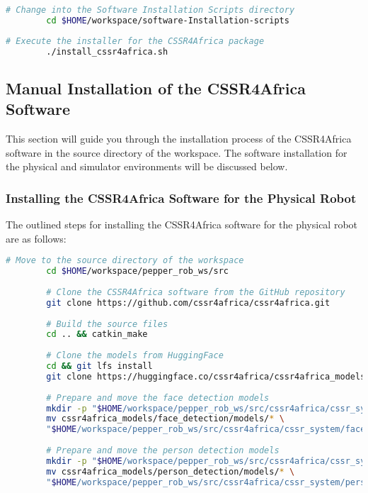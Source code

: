 \documentclass{CSSRforAfrica}
\begin{document}
{		\begin{lstlisting}[style=withoutNumbering, language=bash]
		# Change into the Software Installation Scripts directory
		cd $HOME/workspace/software-Installation-scripts
		\end{lstlisting}
		
		\begin{lstlisting}[style=withoutNumbering, language=bash]
		# Execute the installer for the CSSR4Africa package
		./install_cssr4africa.sh
		\end{lstlisting}
		
		
		\subsection{Manual Installation of the CSSR4Africa Software}
		This section will guide you through the installation process of the CSSR4Africa software in the source directory of the workspace. The software installation for the physical and simulator environments will be discussed below.
		
		\subsubsection{Installing the CSSR4Africa Software for the Physical Robot}
		The outlined steps for installing the CSSR4Africa software for the physical robot are as follows:
		\begin{lstlisting}[style=withoutNumbering, language=bash]
		# Move to the source directory of the workspace
		cd $HOME/workspace/pepper_rob_ws/src
		
		# Clone the CSSR4Africa software from the GitHub repository
		git clone https://github.com/cssr4africa/cssr4africa.git
		
		# Build the source files
		cd .. && catkin_make
		
		# Clone the models from HuggingFace
		cd && git lfs install
		git clone https://huggingface.co/cssr4africa/cssr4africa_models
		
		# Prepare and move the face detection models
		mkdir -p "$HOME/workspace/pepper_rob_ws/src/cssr4africa/cssr_system/face_detection/models"
		mv cssr4africa_models/face_detection/models/* \
		"$HOME/workspace/pepper_rob_ws/src/cssr4africa/cssr_system/face_detection/models/"
		
		# Prepare and move the person detection models
		mkdir -p "$HOME/workspace/pepper_rob_ws/src/cssr4africa/cssr_system/person_detection/models"
		mv cssr4africa_models/person_detection/models/* \
		"$HOME/workspace/pepper_rob_ws/src/cssr4africa/cssr_system/person_detection/models/"
		

\end{lstlisting}}
\end{document}
